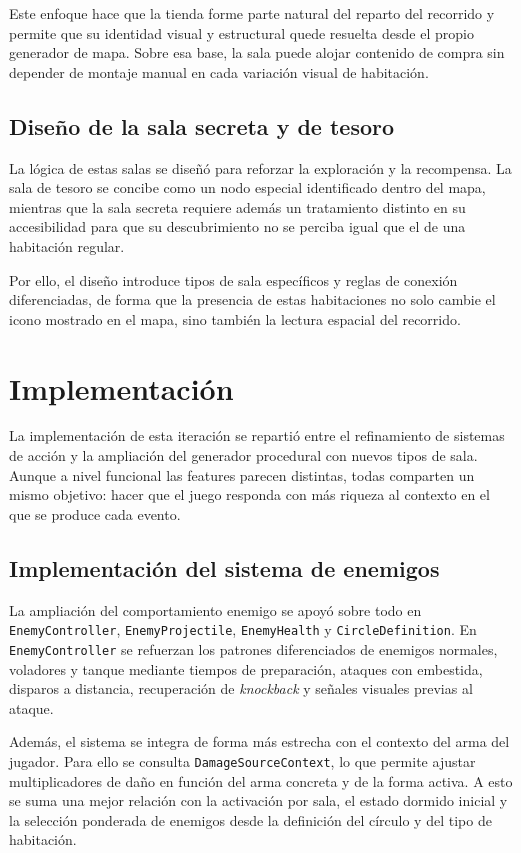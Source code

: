 Este enfoque hace que la tienda forme parte natural del reparto del recorrido y permite que
su identidad visual y estructural quede resuelta desde el propio generador de mapa. Sobre esa
base, la sala puede alojar contenido de compra sin depender de montaje manual en cada
variación visual de habitación.

\subsection{Diseño de la sala secreta y de tesoro}
La lógica de estas salas se diseñó para reforzar la exploración y la recompensa. La sala de
tesoro se concibe como un nodo especial identificado dentro del mapa, mientras que la sala
secreta requiere además un tratamiento distinto en su accesibilidad para que su descubrimiento
no se perciba igual que el de una habitación regular.

Por ello, el diseño introduce tipos de sala específicos y reglas de conexión diferenciadas,
de forma que la presencia de estas habitaciones no solo cambie el icono mostrado en el mapa,
sino también la lectura espacial del recorrido.

\section{Implementación}
La implementación de esta iteración se repartió entre el refinamiento de sistemas de acción
y la ampliación del generador procedural con nuevos tipos de sala. Aunque a nivel funcional
las features parecen distintas, todas comparten un mismo objetivo: hacer que el juego
responda con más riqueza al contexto en el que se produce cada evento.

\subsection{Implementación del sistema de enemigos}
La ampliación del comportamiento enemigo se apoyó sobre todo en \texttt{EnemyController},
\texttt{EnemyProjectile}, \texttt{EnemyHealth} y \texttt{CircleDefinition}. En
\texttt{EnemyController} se refuerzan los patrones diferenciados de enemigos normales,
voladores y tanque mediante tiempos de preparación, ataques con embestida, disparos a
distancia, recuperación de \textit{knockback} y señales visuales previas al ataque.

Además, el sistema se integra de forma más estrecha con el contexto del arma del jugador.
Para ello se consulta \texttt{DamageSourceContext}, lo que permite ajustar multiplicadores de
daño en función del arma concreta y de la forma activa. A esto se suma una mejor relación
con la activación por sala, el estado dormido inicial y la selección ponderada de enemigos
desde la definición del círculo y del tipo de habitación.

